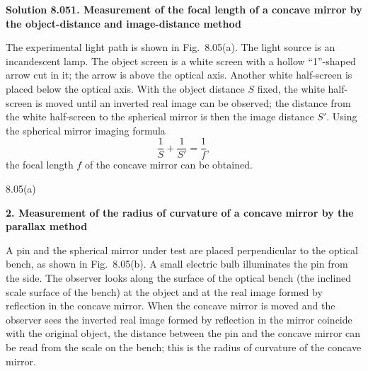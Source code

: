 \textbf{Solution 8.05}\quad \textbf{1. Measurement of the focal length of a concave mirror by the object-distance and image-distance method}

The experimental light path is shown in Fig.~8.05(a). The light source is an incandescent lamp. The object screen is a white screen with a hollow ``1''-shaped arrow cut in it; the arrow is above the optical axis. Another white half-screen is placed below the optical axis. With the object distance $S$ fixed, the white half-screen is moved until an inverted real image can be observed; the distance from the white half-screen to the spherical mirror is then the image distance $S'$. Using the spherical mirror imaging formula
\[
\frac{1}{S}+\frac{1}{S'}=\frac{1}{f},
\]
the focal length $f$ of the concave mirror can be obtained.

\begin{figbox}{8.05(a)}
\end{figbox}

\textbf{2. Measurement of the radius of curvature of a concave mirror by the parallax method}

A pin and the spherical mirror under test are placed perpendicular to the optical bench, as shown in Fig.~8.05(b). A small electric bulb illuminates the pin from the side. The observer looks along the surface of the optical bench (the inclined scale surface of the bench) at the object and at the real image formed by reflection in the concave mirror. When the concave mirror is moved and the observer sees the inverted real image formed by reflection in the mirror coincide with the original object, the distance between the pin and the concave mirror can be read from the scale on the bench; this is the radius of curvature of the concave mirror.

